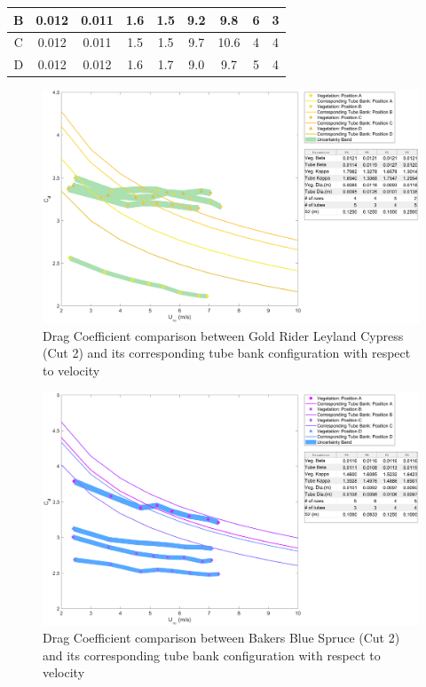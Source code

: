 \documentclass[12pt]{article}
\begin{document}
\begin{table}[!]
\begin{tabular}{|c|c|c|c|c|c|c|c|c|}
    B                            & 0.012            & 0.011      & 1.6                  & 1.5                & 9.2               & 9.8        & 6                           & 3                                \\ \hline
    C                            & 0.012            & 0.011      & 1.5                  & 1.5                & 9.7               & 10.6       & 4                           & 4                                \\ \hline
    D                            & 0.012            & 0.012      & 1.6                  & 1.7                & 9.0               & 9.7        & 5                           & 4                                \\ \hline
    \end{tabular}
\end{table}

\begin{figure}[!]
	\centering 	
\includegraphics[width=\textwidth,keepaspectratio]{Picture13.pdf}
	\caption{Drag Coefficient comparison between Gold Rider Leyland Cypress (Cut 2) and its corresponding tube bank configuration with respect to velocity}
	\label{fig:TBGR}
\end{figure}

\begin{figure}[!]
	\centering 	
\includegraphics[width=\textwidth,keepaspectratio]{Picture14.pdf}
	\caption{Drag Coefficient comparison between Bakers Blue Spruce (Cut 2) and its corresponding tube bank configuration with respect to velocity}
	\label{fig:TBBB}
\end{figure}
\end{document}
